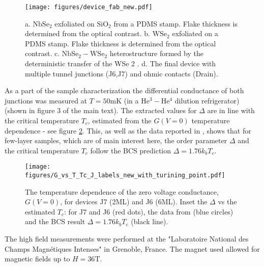 \documentclass[showpacs,superscriptaddress,onecolumn,prb]{revtex4}
\begin{document}
\begin{figure}[h]
	\centering
	\texttt{[image: figures/device\_fab\_new.pdf]}
	\caption{
		a. $\mathrm{NbSe_2}$ exfoliated on $\mathrm{SiO_2}$ from a PDMS stamp. Flake thickness is
		determined from the optical contrast. b. $\mathrm{WSe_2}$ exfoliated on a PDMS stamp.
		Flake thickness is determined from the optical contrast. c. $\mathrm{NbSe_2 - WSe_2}$
		heterostructure formed by the deterministic transfer of the WSe 2 . d. The
		final device with multiple tunnel junctions (J6,J7) and ohmic contacts
		(Drain).
	}
	\label{fig:sample}
\end{figure}

As a part of the sample characterization the differential conductance of both junctions was measured at $T=50\mathrm{mK}$ (in a $\mathrm{He^3-He^4}$ dilution refrigerator) (shown in figure 3 of the main text). The extracted values for $\Delta$ are in line with the critical temperature $T_c$, estimated from the $G(V=0)$ temperature dependence - see figure \ref{fig:GvsT}.
This, as well as the data reported in \cite{khestanova2018unusual}, shows that for few-layer samples, which are of main interest here, the order parameter $\Delta$ and the critical temperature $T_c$ follow the BCS prediction $\Delta= 1.76k_bT_c$.

\begin{figure}[h]
	\centering
	\texttt{[image: figures/G\_vs\_T\_Tc\_J\_labels\_new\_with\_turining\_point.pdf]}
	\caption{The temperature dependence of the zero voltage conductance, $G(V=0)$, for devices J7 (2ML) and J6 (6ML).
		Inset the $\Delta$ vs the estimated $T_c$: for J7 and J6 (red dots), the data from \cite{dvir2018spectroscopy} (blue circles) and the BCS result $\Delta=1.76k_bT_c$ (black line).
	}
	\label{fig:GvsT}
\end{figure}


The high field measurements were performed at the "Laboratoire National des Champs Magnétiques Intenses" in Grenoble, France. The magnet used allowed for magnetic fields up to $H=36\mathrm{T}$.
\end{document}
